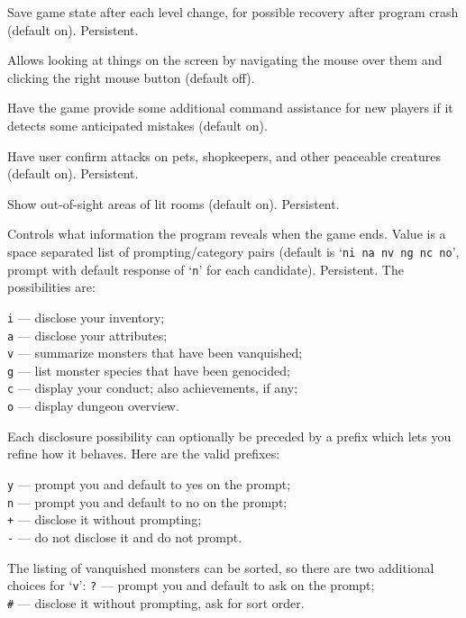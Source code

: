 \item[\ib{checkpoint}]
Save game state after each level change, for possible recovery after
program crash (default on).  Persistent.
\item[\ib{clicklook}]
Allows looking at things on the screen by navigating the mouse
over them and clicking the right mouse button (default off).
\item[\ib{cmdassist}]
Have the game provide some additional command assistance for new
players if it detects some anticipated mistakes (default on).
\item[\ib{confirm}]
Have user confirm attacks on pets, shopkeepers, and other
peaceable creatures (default on).  Persistent.
\item[\ib{dark\verb+_+room}]
Show out-of-sight areas of lit rooms (default on).  Persistent.
\item[\ib{disclose}]
Controls what information the program reveals when the game ends.
Value is a space separated list of prompting/category pairs
(default is `{\tt ni na nv ng nc no}',
prompt with default response of `{\tt n}' for each candidate).
Persistent.
The possibilities are:

{\tt i} --- disclose your inventory;\\
{\tt a} --- disclose your attributes;\\
{\tt v} --- summarize monsters that have been vanquished;\\
{\tt g} --- list monster species that have been genocided;\\
{\tt c} --- display your conduct; also achievements, if any;\\
{\tt o} --- display dungeon overview.

Each disclosure possibility can optionally be preceded by a prefix which
lets you refine how it behaves.  Here are the valid prefixes:

{\tt y} --- prompt you and default to yes on the prompt;\\
{\tt n} --- prompt you and default to no on the prompt;\\
{\tt +} --- disclose it without prompting;\\
{\tt -} --- do not disclose it and do not prompt.

The listing of vanquished monsters can be sorted,
so there are two additional choices for `{\tt v}':
{\tt ?} --- prompt you and default to ask on the prompt;\\
{\tt\#} --- disclose it without prompting, ask for sort order.

